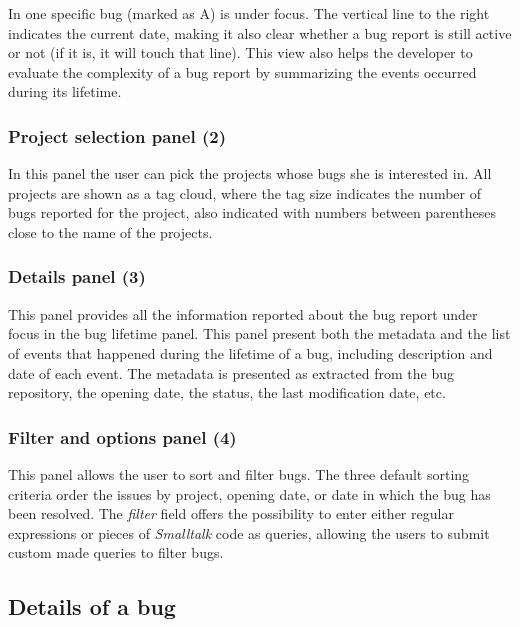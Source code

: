 In  one specific bug (marked as A) is under focus.
The vertical line to the right indicates the current date, making it also clear whether a bug report is still active or not (if it is, it will touch that line).
This view also helps the developer to evaluate the complexity of a bug report by summarizing the events occurred during its lifetime.

\subsubsection{Project selection panel (2)}
In this panel the user can pick the projects whose bugs she is interested in.
All projects are shown as a tag cloud, where the tag size indicates the number of bugs reported for the project, also indicated with numbers between parentheses close to the name of the projects.

\subsubsection{Details panel (3)}
This panel provides all the information reported about the bug report under focus in the bug lifetime panel.
This panel present both the metadata and the list of events that happened during the lifetime of a bug, including description and date of each event.
The metadata is presented as extracted from the bug repository, \eg the opening date, the status, the last modification date, etc.

\subsubsection{Filter and options panel (4)}
This panel allows the user to sort and filter bugs.
The three default sorting criteria order the issues by project, opening date, or date in which the bug has been resolved.
The \textit{filter} field offers the possibility to enter either regular expressions or pieces of \emph{Smalltalk} code as queries, allowing the users to submit custom made queries to filter bugs.

\subsection{Details of a bug}

